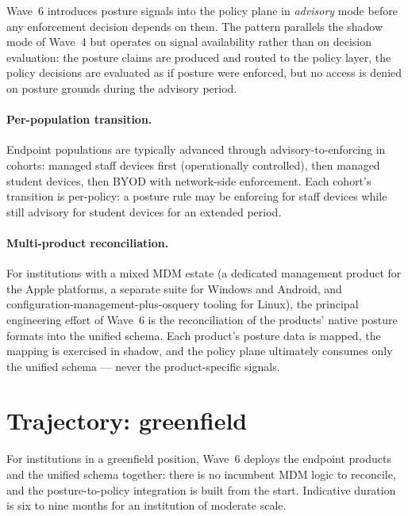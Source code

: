 Wave~6 introduces posture signals into the policy plane in
\emph{advisory} mode before any enforcement decision depends on
them. The pattern parallels the shadow mode of Wave~4 but operates
on signal availability rather than on decision evaluation: the
posture claims are produced and routed to the policy layer, the
policy decisions are evaluated as if posture were enforced, but
no access is denied on posture grounds during the advisory
period.

\paragraph{Per-population transition.} Endpoint populations are
typically advanced through advisory-to-enforcing in cohorts:
managed staff devices first (operationally controlled), then
managed student devices, then BYOD with network-side enforcement.
Each cohort's transition is per-policy: a posture rule may be
enforcing for staff devices while still advisory for student
devices for an extended period.

\paragraph{Multi-product reconciliation.} For institutions with a
mixed MDM estate (a dedicated management product for the Apple
platforms, a separate suite for Windows and Android, and
configuration-management-plus-osquery tooling for Linux), the
principal engineering effort
of Wave~6 is the reconciliation of the products' native posture
formats into the unified schema. Each product's posture data is
mapped, the mapping is exercised in shadow, and the policy plane
ultimately consumes only the unified schema --- never the
product-specific signals.

\section{Trajectory: greenfield}
\label{sec:w6-greenfield}

For institutions in a greenfield position, Wave~6 deploys the
endpoint products and the unified schema together: there is no
incumbent MDM logic to reconcile, and the posture-to-policy
integration is built from the start. Indicative duration is six to
nine months for an institution of moderate scale.

